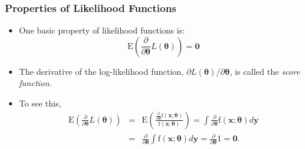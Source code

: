 \documentclass{beamer}
\begin{document}
\begin{frame}[shrink=2]
\frametitle{Properties of Likelihood Functions}
\begin{itemize}
\item One basic property of likelihood functions is:
\begin{equation*}\label{E11:ScoreZero}
\mathrm{E} \left( \frac{ \partial}{\partial \boldsymbol \theta}
L(\boldsymbol \theta) \right) = \mathbf 0
\end{equation*}
\item The derivative of the log-likelihood function, $\partial L(\boldsymbol \theta)/\partial \boldsymbol \theta$, is called the
\emph{score function}.
\item To see this,
\begin{eqnarray*}
\mathrm{E} \left( \frac{ \partial}{\partial \boldsymbol \theta} L(\boldsymbol \theta) \right)
&=& \mathrm{E} \left( \frac{\frac{\partial}{\partial \boldsymbol \theta}\mathrm{f}(\mathbf{x};\boldsymbol \theta)}{\mathrm{f}(\mathbf{x};\boldsymbol \theta )}  \right)
= \int\frac{\partial}{\partial \boldsymbol \theta} \mathrm{f}(\mathbf{x};\boldsymbol \theta ) d \mathbf y \\
&=& \frac{\partial}{\partial \boldsymbol \theta} \int \mathrm{f}(\mathbf{x};\boldsymbol \theta ) d \mathbf y
= \frac{\partial}{\partial \boldsymbol \theta} 1 = \mathbf 0.
\end{eqnarray*}
\end{itemize}
\end{frame}
\end{document}
